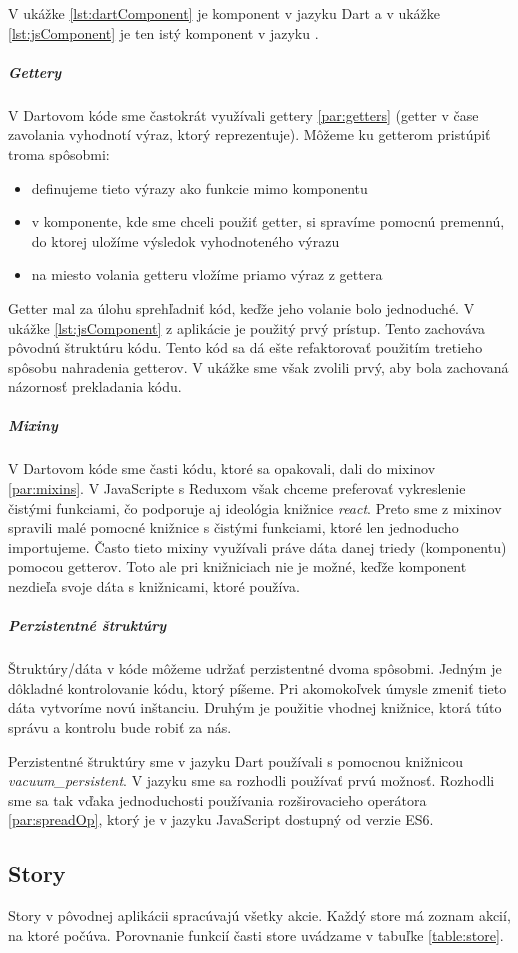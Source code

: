 V ukážke \ref{lst:dartComponent} je komponent v jazyku Dart a v ukážke \ref{lst:jsComponent} je ten istý komponent v jazyku \JS{}.

\subparagraph{Gettery} \NEW{}
V Dartovom kóde sme častokrát využívali gettery \ref{par:getters} (getter v čase zavolania vyhodnotí výraz, ktorý reprezentuje). Môžeme ku getterom pristúpiť troma spôsobmi: 
\begin{itemize}
  \item definujeme tieto výrazy ako funkcie mimo komponentu
  \item v komponente, kde sme chceli použiť getter, si spravíme pomocnú premennú, do ktorej uložíme výsledok vyhodnoteného výrazu
  \item na miesto volania getteru vložíme priamo výraz z gettera
\end{itemize}

Getter mal za úlohu sprehľadniť kód, keďže jeho volanie bolo jednoduché.
V ukážke \ref{lst:jsComponent} z aplikácie je použitý prvý prístup. Tento zachováva pôvodnú štruktúru kódu. Tento kód sa dá ešte refaktorovať použitím tretieho spôsobu nahradenia getterov. V ukážke sme však zvolili prvý, aby bola zachovaná názornosť prekladania kódu.

\subparagraph{Mixiny}
V Dartovom kóde sme časti kódu, ktoré sa opakovali, dali do mixinov \ref{par:mixins}. V JavaScripte s Reduxom však chceme preferovať vykreslenie čistými funkciami, čo podporuje aj ideológia knižnice \emph{react}. Preto sme z mixinov spravili malé pomocné knižnice s čistými funkciami, ktoré len jednoducho importujeme. Často tieto mixiny využívali práve dáta danej triedy (komponentu) pomocou getterov. Toto ale pri knižniciach nie je možné, keďže komponent nezdieľa svoje dáta s knižnicami, ktoré používa.

\subparagraph{Perzistentné štruktúry} \NEW{}
Štruktúry/dáta v kóde môžeme udržať perzistentné dvoma spôsobmi. 
Jedným je dôkladné kontrolovanie kódu, ktorý píšeme. Pri akomokoľvek úmysle zmeniť tieto dáta vytvoríme novú inštanciu.
Druhým je použitie vhodnej knižnice, ktorá túto správu a kontrolu bude robiť za nás.

Perzistentné štruktúry sme v jazyku Dart používali s pomocnou knižnicou \emph{vacuum\_persistent}. V jazyku \JS{} sme sa rozhodli používať prvú možnosť. Rozhodli sme sa tak vďaka jednoduchosti používania rozširovacieho operátora \ref{par:spreadOp}, ktorý je v jazyku JavaScript dostupný od verzie ES6.

\subsection{Story}
\NEW{}
Story v pôvodnej aplikácii spracúvajú všetky akcie. Každý store má zoznam akcií, na ktoré počúva. Porovnanie funkcií časti store uvádzame v tabuľke \ref{table:store}.

